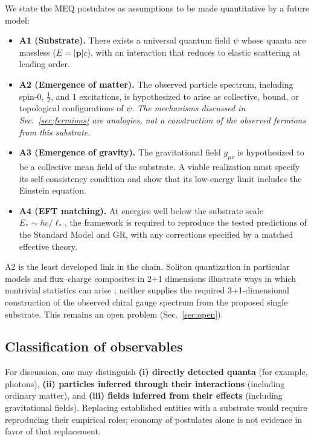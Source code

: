 \documentclass[11pt,a4paper]{article}
\newcommand{\meq}{MEQ}
\begin{document}
We state the \meq{} postulates as assumptions to be made quantitative by a future model:
\begin{itemize}
\item \textbf{A1 (Substrate).} There exists a universal quantum field $\psi$ whose quanta are
massless ($E = |\mathbf{p}|c$), with an interaction that reduces to elastic scattering at leading
order.
\item \textbf{A2 (Emergence of matter).} The observed particle spectrum, including spin-0,
$\tfrac12$, and 1 excitations, is hypothesized to arise as collective, bound, or topological
configurations of $\psi$.
\emph{The mechanisms discussed in Sec.~\ref{sec:fermions} are analogies, not a construction of
the observed fermions from this substrate.}
\item \textbf{A3 (Emergence of gravity).} The gravitational field $g_{\mu\nu}$ is hypothesized to
be a collective mean field of the substrate. A viable realization must specify its self-consistency
condition and show that its low-energy limit includes the Einstein equation.
\item \textbf{A4 (EFT matching).} At energies well below the substrate scale
$E_\ast \sim \hbar c/\ell_\ast$, the framework is required to reproduce the tested predictions of
the Standard Model and GR, with any corrections specified by a matched effective theory.
\end{itemize}
A2 is the least developed link in the chain. Soliton quantization in particular models and
flux--charge composites in 2+1 dimensions illustrate ways in which nontrivial statistics can arise
\cite{Skyrme1962,Goldstone1981,Wilczek1982}; neither supplies the required 3+1-dimensional
construction of the observed chiral gauge spectrum from the proposed single substrate. This
remains an open problem (Sec.~\ref{sec:open}).

\subsection{Classification of observables}

For discussion, one may distinguish \textbf{(i) directly detected quanta} (for example, photons),
\textbf{(ii) particles inferred through their interactions} (including ordinary matter), and
\textbf{(iii) fields inferred from their effects} (including gravitational fields). Replacing
established entities with a substrate would require reproducing their empirical roles; economy of
postulates alone is not evidence in favor of that replacement.
\end{document}
